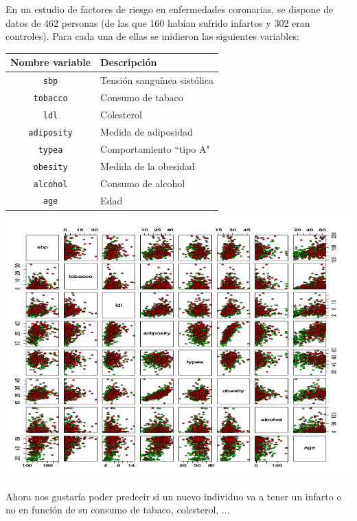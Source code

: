 \begin{example}
En un estudio de factores de riesgo en enfermedades coronarias, se dispone de datos de 462 personas (de las que 160 habían sufrido infartos y 302 eran controles). Para cada una de ellas se midieron las siguientes variables:


\begin{center}
\label{example:infartos}
{\scriptsize

\begin{tabular}{|c|l|}
\hline Nombre variable & Descripci\'{o}n  \\
\hline {\tt sbp} & Tensión sanguínea sistólica \\
{\tt tobacco} & Consumo de tabaco\\
{\tt ldl} & Colesterol\\
{\tt adiposity} & Medida de adiposidad\\
{\tt typea} & Comportamiento ``tipo A"\\
{\tt obesity} & Medida de la obesidad\\
{\tt alcohol} & Consumo de alcohol\\
{\tt age} & Edad \\
 \hline
 \end{tabular}

 }
\end{center}

\includegraphics[width=13 cm]{img/pairs-heart.png}


Ahora nos gustaría poder predecir si un nuevo individuo va a tener un infarto o no en función de su consumo de tabaco, colesterol, ...
\end{example}


